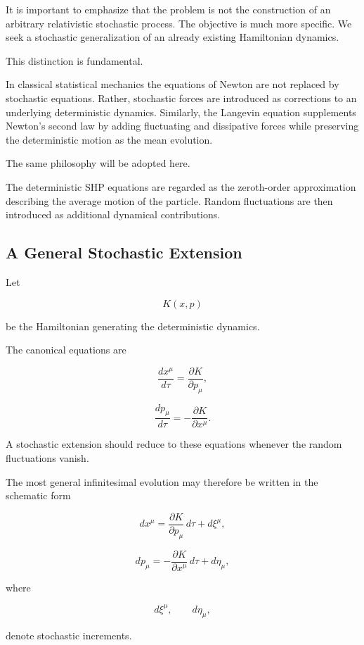 It is important to emphasize that the problem is not the construction of
an arbitrary relativistic stochastic process. The objective is much more
specific. We seek a stochastic generalization of an already existing
Hamiltonian dynamics.

This distinction is fundamental.

In classical statistical mechanics the equations of Newton are not
replaced by stochastic equations. Rather, stochastic forces are
introduced as corrections to an underlying deterministic dynamics.
Similarly, the Langevin equation supplements Newton's second law by
adding fluctuating and dissipative forces while preserving the
deterministic motion as the mean evolution.

The same philosophy will be adopted here.

The deterministic SHP equations are regarded as the zeroth-order
approximation describing the average motion of the particle. Random
fluctuations are then introduced as additional dynamical contributions.

\subsection{A General Stochastic Extension}

Let

\[
K(x,p)
\]

be the Hamiltonian generating the deterministic dynamics.

The canonical equations are

\[
\frac{dx^\mu}{d\tau}
=
\frac{\partial K}{\partial p_\mu},
\]

\[
\frac{dp_\mu}{d\tau}
=
-
\frac{\partial K}{\partial x^\mu}.
\]

A stochastic extension should reduce to these equations whenever the
random fluctuations vanish.

The most general infinitesimal evolution may therefore be written in the
schematic form

\[
dx^\mu
=
\frac{\partial K}{\partial p_\mu}\,d\tau
+
d\xi^\mu,
\]

\[
dp_\mu
=
-
\frac{\partial K}{\partial x^\mu}\,d\tau
+
d\eta_\mu,
\]

where

\[
d\xi^\mu,
\qquad
d\eta_\mu,
\]

denote stochastic increments.

